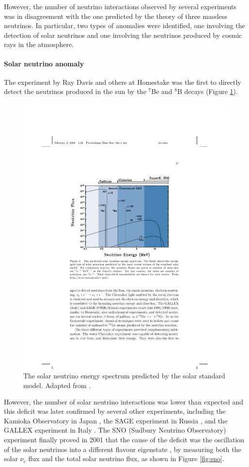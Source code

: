 However, the number of neutrino interactions observed by several experiments was in disagreement with the one predicted by the theory of three massless neutrinos. In particular, two types of anomalies were identified, one involving the detection of solar neutrinos and one involving the neutrinos produced by cosmic rays in the atmosphere.

\paragraph{Solar neutrino anomaly}
The experiment by Ray Davis and others at Homestake was the first to directly detect the neutrinos produced in the sun \cite{Davis:1968cp} by the $^7$Be and $^8$B decays (Figure \ref{fig:solar}). 

\begin{figure}[htbp]
    \centering
    \includegraphics[width=0.75\linewidth]{figures/solar.pdf}
    \caption{The solar neutrino energy spectrum predicted by the solar standard model. Adapted from \cite{Bahcall:2000nu}.}
    \label{fig:solar}
\end{figure}

However, the number of solar neutrino interactions was lower than expected and this deficit was later confirmed by several other experiments, including the Kamioka Observatory in Japan \cite{Hirata:1989zj}, the SAGE experiment in Russia \cite{Abdurashitov:1994bc}, and the GALLEX experiment in Italy \cite{Hampel:1998xg}. The SNO (Sudbury Neutrino Observatory) experiment finally proved in 2001 that the cause of the deficit was the oscillation of the solar neutrinos into a different flavour eigenstate \cite{Ahmad:2002jz}, by measuring both the solar $\nu_{e}$ flux and the total solar neutrino flux, as shown in Figure \ref{fig:sno}. 

